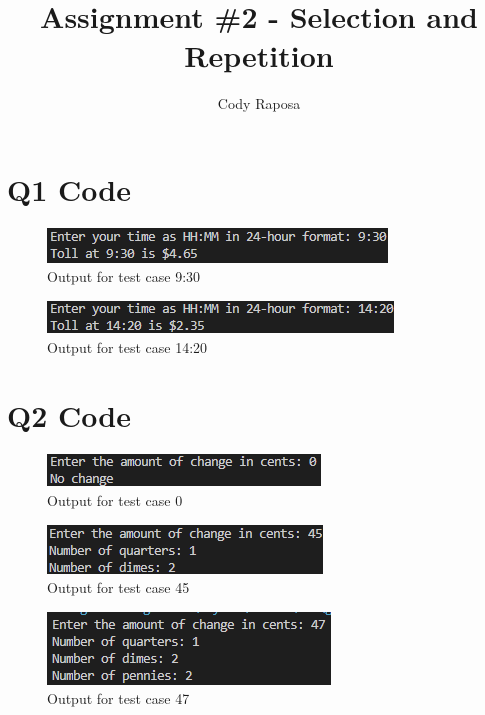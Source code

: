 \documentclass{article}
\title{Assignment \#2 - Selection and Repetition}
\author{Cody Raposa}
\affil{ELEC2850 Microcontrollers Using C Programming}
\begin{document}
\maketitle
\begin{flushleft}
	\section{Q1 Code}
	
    \begin{figure}[!h]
        \begin{centering}
          \includegraphics[scale=1]{Q1_p1.png}
          \caption{Output for test case 9:30}
        \end{centering}
      \end{figure}
      \begin{figure}[!h]
        \begin{centering}
          \includegraphics[scale=1]{Q1_p2.png}
          \caption{Output for test case 14:20}
        \end{centering}
      \end{figure}
      \newpage
    \section{Q2 Code}
    
    \begin{figure}[!h]
        \begin{centering}
          \includegraphics[scale=1]{Q2_p1.png}
          \caption{Output for test case 0}
        \end{centering}
      \end{figure}
    \begin{figure}[!h]
        \begin{centering}
          \includegraphics[scale=1]{Q2_p2.png}
          \caption{Output for test case 45}
        \end{centering}
      \end{figure}
    \begin{figure}[!h]
        \begin{centering}
          \includegraphics[scale=1]{Q2_p3.png}
          \caption{Output for test case 47}
        \end{centering}
    \end{figure}
    \newpage

\end{flushleft}
\end{document}
